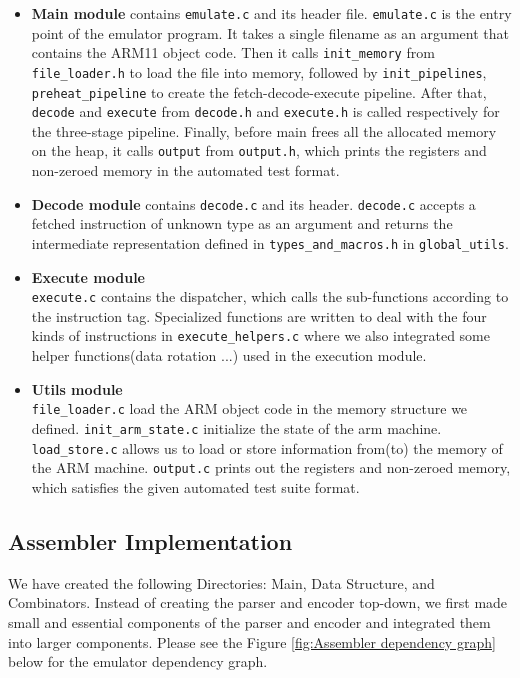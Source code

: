 \documentclass{article}
\begin{document}
\begin{itemize}
    \item \textbf{Main module} contains \texttt{emulate.c} and its header file. \texttt{emulate.c} is the entry point of the emulator program. It takes a single filename as an argument that contains the ARM11 object code. Then it calls \texttt{init\_memory} from \texttt{file\_loader.h} to load the file into memory, followed by \texttt{init\_pipelines}, \texttt{preheat\_pipeline} to create the fetch-decode-execute pipeline. After that, \texttt{decode} and \texttt{execute} from \texttt{decode.h} and \texttt{execute.h} is called respectively for the three-stage pipeline. Finally, before main frees all the allocated memory on the heap, it calls \texttt{output} from \texttt{output.h}, which prints the registers and non-zeroed memory in the automated test format. 
    
    \item \textbf{Decode module} contains \texttt{decode.c} and its header. \texttt{decode.c} accepts a fetched instruction of unknown type as an argument and returns the intermediate representation defined in \texttt{types\_and\_macros.h} in \texttt{global\_utils}.
    
    \item \textbf{Execute module} \\
    \texttt{execute.c} contains the dispatcher, which calls the sub-functions according to the instruction tag. Specialized functions are written to deal with the four kinds of instructions in \texttt{execute\_helpers.c} where we also integrated some helper functions(data rotation ...) used in the execution module.
    
    \item \textbf{Utils module} \\
    \texttt{file\_loader.c} load the ARM object code in the memory structure we defined. \texttt{init\_arm\_state.c} initialize the state of the arm machine. \texttt{load\_store.c} allows us to load or store information from(to) the
    memory of the ARM machine. \texttt{output.c} prints out the registers and non-zeroed memory, which satisfies the given automated test suite format.
    \end{itemize}

\subsection{Assembler Implementation}
We have created the following Directories: Main, Data Structure, and Combinators. Instead of creating the parser and encoder top-down, we first made small and essential components of the parser and encoder and integrated them into larger components. Please see the Figure \ref{fig:Assembler dependency graph} below for the emulator dependency graph.
\end{document}
